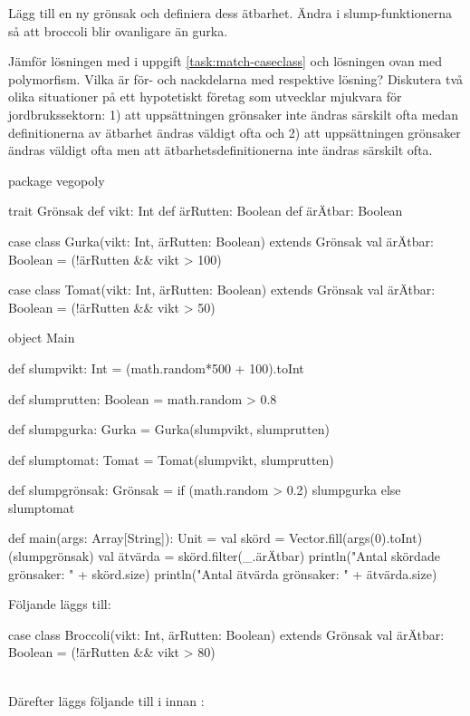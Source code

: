 \Subtask Lägg till en ny grönsak  och definiera dess ätbarhet. Ändra i slump-funktionerna så att broccoli blir ovanligare än gurka.

\Subtask Jämför lösningen med  i uppgift \ref{task:match-caseclass} och lösningen ovan med polymorfism. Vilka är för- och nackdelarna med respektive lösning? Diskutera två olika situationer på ett hypotetiskt företag som utvecklar mjukvara för jordbrukssektorn: 1) att uppsättningen grönsaker inte ändras särskilt ofta medan definitionerna av ätbarhet ändras väldigt ofta och 2) att uppsättningen grönsaker ändras väldigt ofta men att ätbarhetsdefinitionerna inte ändras särskilt ofta.



\SOLUTION


\TaskSolved \what


\SubtaskSolved
\begin{Code}
package vegopoly

trait Grönsak {
	def vikt: Int
	def ärRutten: Boolean
	def ärÄtbar: Boolean
}

case class Gurka(vikt: Int, ärRutten: Boolean) extends Grönsak {
  val ärÄtbar: Boolean = (!ärRutten && vikt > 100)
}

case class Tomat(vikt: Int, ärRutten: Boolean) extends Grönsak {
  val ärÄtbar: Boolean = (!ärRutten && vikt > 50)
}

object Main{
	def slumpvikt: Int = (math.random*500 + 100).toInt

	def slumprutten: Boolean = math.random > 0.8

	def slumpgurka: Gurka = Gurka(slumpvikt, slumprutten)

	def slumptomat: Tomat = Tomat(slumpvikt, slumprutten)

	def slumpgrönsak: Grönsak =
    if (math.random > 0.2) slumpgurka else slumptomat

	def main(args: Array[String]): Unit = {
		val skörd = Vector.fill(args(0).toInt)(slumpgrönsak)
		val ätvärda = skörd.filter(_.ärÄtbar)
		println("Antal skördade grönsaker: " + skörd.size)
		println("Antal ätvärda grönsaker: " + ätvärda.size)
	}
}
\end{Code}

\SubtaskSolved
Följande  läggs till:
\begin{Code}
case class Broccoli(vikt: Int, ärRutten: Boolean) extends Grönsak {
  val ärÄtbar: Boolean = (!ärRutten && vikt > 80)
}
\end{Code}
~\\
Därefter läggs följande till i  innan :

